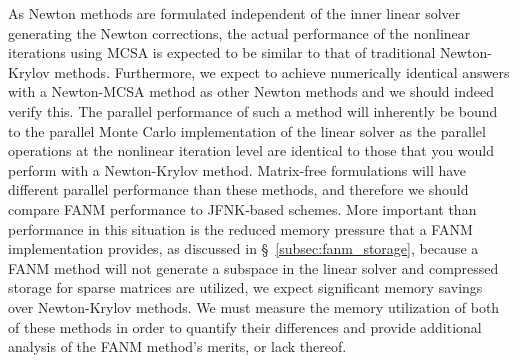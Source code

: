As Newton methods are formulated independent of the inner linear
solver generating the Newton corrections, the actual performance of
the nonlinear iterations using MCSA is expected to be similar to that
of traditional Newton-Krylov methods. Furthermore, we expect to
achieve numerically identical answers with a Newton-MCSA method as
other Newton methods and we should indeed verify this. The parallel
performance of such a method will inherently be bound to the parallel
Monte Carlo implementation of the linear solver as the parallel
operations at the nonlinear iteration level are identical to those
that you would perform with a Newton-Krylov method. Matrix-free
formulations will have different parallel performance than these
methods, and therefore we should compare FANM performance to JFNK-based
schemes. More important than performance in this situation is the
reduced memory pressure that a FANM implementation provides, as
discussed in \S~\ref{subsec:fanm_storage}, because a FANM method will
not generate a subspace in the linear solver and compressed storage
for sparse matrices are utilized, we expect significant memory savings
over Newton-Krylov methods. We must measure the memory utilization of
both of these methods in order to quantify their differences and
provide additional analysis of the FANM method's merits, or lack
thereof.

